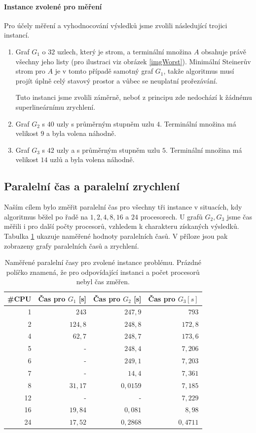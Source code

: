 \documentclass[12pt]{article}
\theoremstyle{definition}
\begin{document}
\paragraph{Instance zvolené pro měření}\mbox{}\newline
Pro účely měření a vyhodnocování výsledků jsme zvolili následující trojici instancí.
\begin{enumerate}
	\item Graf $G_1$ o $32$ uzlech, který je strom, a terminální množina $A$ obsahuje právě všechny jeho listy (pro ilustraci viz obrázek \ref{imgWorst}).
	Minimální Steinerův strom pro $A$ je v tomto případě samotný graf $G_1$, takže
	algoritmus musí projít úplně celý stavový prostor a vůbec se neuplatní prořezávání.
	
	Tuto instanci jsme zvolili záměrně, neboť z principu zde nedochází k žádnému superlineárnímu zrychlení.
	\item Graf $G_2$ s $40$ uzly s průměrným stupněm uzlu $4$. Terminální množina má velikost $9$ a byla volena náhodně.
	\item Graf $G_3$ s $42$ uzly a s průměrným stupněm uzlu $5$. Terminální množina má velikost $14$ uzlů a byla volena náhodně.
\end{enumerate}
\subsection{Paralelní čas a paralelní zrychlení}
Naším cílem bylo změřit paralelní čas pro všechny tři instance v situacích, kdy
algoritmus běžel po řadě na $1,2,4,8,16$ a $24$ procesorech. U grafů $G_2, G_3$ jsme
čas měřili i pro další počty procesorů, vzhledem k charakteru získaných výsledků. Tabulka \ref{tabTime} ukazuje
naměřené hodnoty paralelních časů. V příloze jsou pak zobrazeny grafy paralelních časů a zrychlení.

\begin{table}[ht]
	\centering
	\begin{tabular}{r|r|r|r}
		\#CPU & Čas pro $G_1$ [s]& Čas pro $G_2$ [s]& Čas pro $G_3 [s]$\\
		\hline\hline
		1 & $243$ & $247,9$ & $793$\\
		\hline
		2 & $124,8$ & $248,8$ & $172,8$\\
		\hline
		4 & $62,7$ & $248,7$ & $173,6$\\
		\hline
		5 & - & $248,4$ & $7,206$\\
		\hline
		6 & - & $249,1$ & $7,203$\\
		\hline
		7 & - & $14,4$ & $7,361$\\
		\hline
		8 & $31,17$ & $0,0159$ & $7,185$\\
		\hline
		12 & - & - & $7,229$\\
		\hline
		16 & $19,84$ & $0,081$ & $8,98$\\
		\hline
		24 & $17,52$ & $0,2868$ & $0,4711$\\
	
	\end{tabular}
	\caption{Naměřené paralelní časy pro zvolené instance problému. Prázdné políčko znamená,
		že pro odpovídající instanci a počet procesorů nebyl čas změřen.}
	\label{tabTime}
\end{table}
\end{document}
